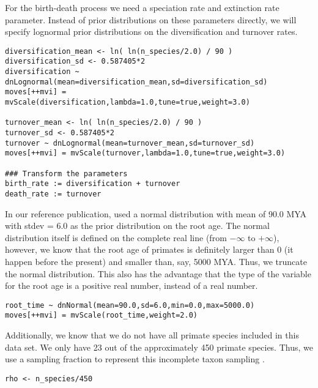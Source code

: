 For the birth-death process we need a speciation rate and extinction rate parameter.
Instead of prior distributions on these parameters directly, we will specify lognormal prior distributions on the diversification and turnover rates.
{\tt \begin{snugshade*}
\begin{lstlisting}
diversification_mean <- ln( ln(n_species/2.0) / 90 )
diversification_sd <- 0.587405*2
diversification ~ dnLognormal(mean=diversification_mean,sd=diversification_sd) 
moves[++mvi] = mvScale(diversification,lambda=1.0,tune=true,weight=3.0)

turnover_mean <- ln( ln(n_species/2.0) / 90 )
turnover_sd <- 0.587405*2
turnover ~ dnLognormal(mean=turnover_mean,sd=turnover_sd) 
moves[++mvi] = mvScale(turnover,lambda=1.0,tune=true,weight=3.0)

### Transform the parameters
birth_rate := diversification + turnover
death_rate := turnover
\end{lstlisting}
\end{snugshade*}}

In our reference publication, \cite{Perelman2011} used a normal distribution with mean of 90.0 MYA with stdev = 6.0 as the prior distribution on the root age.
The normal distribution itself is defined on the complete real line (\IE from $-\infty$ to $+\infty$), however, we know that the root age of primates is definitely larger than 0 (it happen before the present) and smaller than, say, 5000 MYA.
Thus, we truncate the normal distribution.
This also has the advantage that the type of the variable for the root age is a positive real number, instead of a real number.
{\tt \begin{snugshade*}
\begin{lstlisting}
root_time ~ dnNormal(mean=90.0,sd=6.0,min=0.0,max=5000.0)
moves[++mvi] = mvScale(root_time,weight=2.0)
\end{lstlisting}
\end{snugshade*}}

Additionally, we know that we do not have all primate species included in this data set.
We only have 23 out of the approximately 450 primate species.
Thus, we use a sampling fraction to represent this incomplete taxon sampling \citep{Hoehna2011,Hoehna2014a}.
{\tt \begin{snugshade*}
\begin{lstlisting}
rho <- n_species/450
\end{lstlisting}
\end{snugshade*}}

